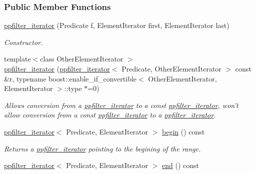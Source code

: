 \subsubsection*{Public Member Functions}
\begin{DoxyCompactItemize}
\item 
\hypertarget{classtrsl_1_1ppfilter__iterator_a3eea027a52e75d8d2840e8d6daca79a1}{
\hyperlink{classtrsl_1_1ppfilter__iterator_a3eea027a52e75d8d2840e8d6daca79a1}{ppfilter\_\-iterator} (Predicate f, ElementIterator first, ElementIterator last)}
\label{classtrsl_1_1ppfilter__iterator_a3eea027a52e75d8d2840e8d6daca79a1}

\begin{DoxyCompactList}\small\item\em Constructor. \item\end{DoxyCompactList}\item 
{\footnotesize template$<$class OtherElementIterator $>$ }\\\hyperlink{classtrsl_1_1ppfilter__iterator_a02f5b311d35437e1fca8df255a659d77}{ppfilter\_\-iterator} (\hyperlink{classtrsl_1_1ppfilter__iterator}{ppfilter\_\-iterator}$<$ Predicate, OtherElementIterator $>$ const \&r, typename boost::enable\_\-if\_\-convertible$<$ OtherElementIterator, ElementIterator $>$::type $\ast$=0)
\begin{DoxyCompactList}\small\item\em Allows conversion from a \hyperlink{classtrsl_1_1ppfilter__iterator}{ppfilter\_\-iterator} to a const \hyperlink{classtrsl_1_1ppfilter__iterator}{ppfilter\_\-iterator}, won't allow conversion from a const \hyperlink{classtrsl_1_1ppfilter__iterator}{ppfilter\_\-iterator} to a \hyperlink{classtrsl_1_1ppfilter__iterator}{ppfilter\_\-iterator}. \item\end{DoxyCompactList}\item 
\hypertarget{classtrsl_1_1ppfilter__iterator_af021932b413e59de85751231d45ce5b7}{
\hyperlink{classtrsl_1_1ppfilter__iterator}{ppfilter\_\-iterator}$<$ Predicate, ElementIterator $>$ \hyperlink{classtrsl_1_1ppfilter__iterator_af021932b413e59de85751231d45ce5b7}{begin} () const }
\label{classtrsl_1_1ppfilter__iterator_af021932b413e59de85751231d45ce5b7}

\begin{DoxyCompactList}\small\item\em Returns a \hyperlink{classtrsl_1_1ppfilter__iterator}{ppfilter\_\-iterator} pointing to the begining of the range. \item\end{DoxyCompactList}\item 
\hypertarget{classtrsl_1_1ppfilter__iterator_aaf4755a54c9ae1c9d87b148c00a1f23d}{
\hyperlink{classtrsl_1_1ppfilter__iterator}{ppfilter\_\-iterator}$<$ Predicate, ElementIterator $>$ \hyperlink{classtrsl_1_1ppfilter__iterator_aaf4755a54c9ae1c9d87b148c00a1f23d}{end} () const }
\label{classtrsl_1_1ppfilter__iterator_aaf4755a54c9ae1c9d87b148c00a1f23d}


\end{DoxyCompactItemize}
